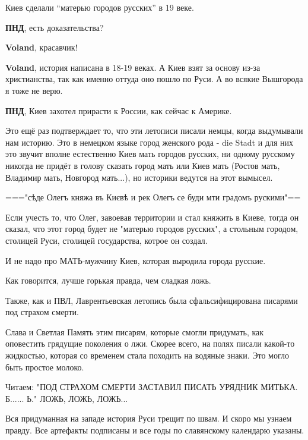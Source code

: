 \begin{itemize}
Киев сделали \enquote{матерью городов русских} в 19 веке.

\begin{itemize} %
\textbf{ПНД}, есть доказательства?

\textbf{Voland}, красавчик!

\textbf{Voland}, история написана в 18-19 веках. А Киев взят за основу из-за христианства, так как именно оттуда оно пошло по Руси. А во всякие Вышгорода я тоже не верю.

\textbf{ПНД}, Киев захотел прирасти к России, как сейчас к Америке.
\end{itemize} %


Это ещё раз подтверждает то, что эти летописи писали немцы, когда выдумывали
нам историю. Это в немецком языке город женского рода - die Stadt и для них это
звучит вполне естественно Киев мать городов русских, ни одному русскому никогда
не придёт в голову сказать город мать или Киев мать (Ростов мать, Владимир
мать, Новгород мать...), но историки ведутся на этот вымысел.


==="сѣде Олегъ княжа въ Києвѣ и рек Олегъ се буди мти градомъ рускими"==

Если учесть то, что Олег, завоевав территории и стал княжить в Киеве, тогда он
сказал, что этот город будет не "матерью городов русских", а стольным городом,
столицей Руси, столицей государства, котрое он создал.

И не надо про МАТЬ-мужчину Киев, которая выродила города русские.


Как говорится, лучше горькая правда, чем сладкая ложь.

Также, как и ПВЛ, Лаврентьевская летопись была сфальсифицирована писарями под
страхом смерти.

Слава и Светлая Память этим писарям, которые смогли придумать, как оповестить
грядущие поколения о лжи. Скорее всего, на полях писали какой-то жидкостью,
которая со временем стала походить на водяные знаки. Это могло быть простое
молоко.

Читаем: "ПОД СТРАХОМ СМЕРТИ ЗАСТАВИЛ ПИСАТЬ УРЯДНИК МИТЬКА. Б...... Ь." ЛОЖЬ,
ЛОЖЬ, ЛОЖЬ...

Вся придуманная на западе история Руси трещит по швам. И скоро мы узнаем
правду. Все артефакты подписаны и все годы по славянскому календарю указаны.


\end{itemize}
